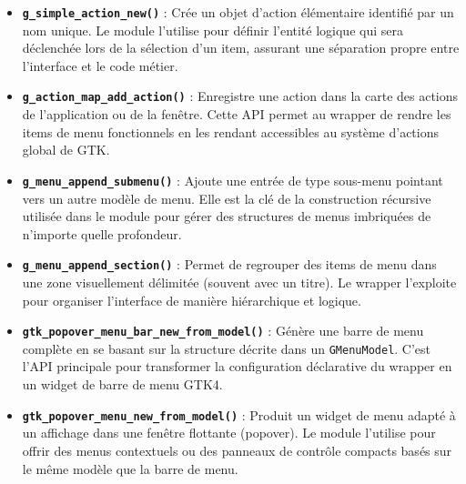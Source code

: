 \begin{itemize}
    \item \textbf{\texttt{g\_simple\_action\_new()}} : Crée un objet d'action élémentaire identifié par un nom unique. Le module l'utilise pour définir l'entité logique qui sera déclenchée lors de la sélection d'un item, assurant une séparation propre entre l'interface et le code métier.
    \item \textbf{\texttt{g\_action\_map\_add\_action()}} : Enregistre une action dans la carte des actions de l'application ou de la fenêtre. Cette API permet au wrapper de rendre les items de menu fonctionnels en les rendant accessibles au système d'actions global de GTK.
    \item \textbf{\texttt{g\_menu\_append\_submenu()}} : Ajoute une entrée de type sous-menu pointant vers un autre modèle de menu. Elle est la clé de la construction récursive utilisée dans le module pour gérer des structures de menus imbriquées de n'importe quelle profondeur.
    \item \textbf{\texttt{g\_menu\_append\_section()}} : Permet de regrouper des items de menu dans une zone visuellement délimitée (souvent avec un titre). Le wrapper l'exploite pour organiser l'interface de manière hiérarchique et logique.
    \item \textbf{\texttt{gtk\_popover\_menu\_bar\_new\_from\_model()}} : Génère une barre de menu complète en se basant sur la structure décrite dans un \texttt{GMenuModel}. C'est l'API principale pour transformer la configuration déclarative du wrapper en un widget de barre de menu GTK4.
    \item \textbf{\texttt{gtk\_popover\_menu\_new\_from\_model()}} : Produit un widget de menu adapté à un affichage dans une fenêtre flottante (popover). Le module l'utilise pour offrir des menus contextuels ou des panneaux de contrôle compacts basés sur le même modèle que la barre de menu.
\end{itemize}

\newpage
